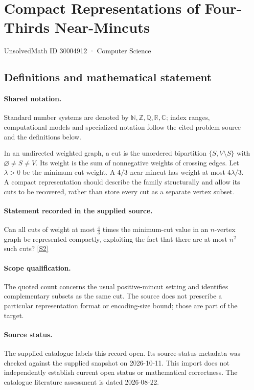 \documentclass[11pt]{article}
\newcommand{\sref}[2]{\hyperlink{source:#1:#2}{[S#2]}}
\begin{document}
\setcounter{section}{30004911}
\section{Compact Representations of Four-Thirds Near-Mincuts}\label{30004912}
{\small\sffamily UnsolvedMath ID 30004912 · Computer Science}
\subsection{Definitions and mathematical statement}

\paragraph{Shared notation.}Standard number systems are denoted by $\mathbb N,\mathbb Z,\mathbb Q,\mathbb R,\mathbb C$; index ranges, computational models and specialized notation follow the cited problem source and the definitions below.


In an undirected weighted graph, a cut is the unordered bipartition $\{S,V\setminus S\}$ with $\varnothing\ne S\ne V$. Its weight is the sum of nonnegative weights of crossing edges. Let $\lambda>0$ be the minimum cut weight. A $4/3$-near-mincut has weight at most $4\lambda/3$. A compact representation should describe the family structurally and allow its cuts to be recovered, rather than store every cut as a separate vertex subset.
\paragraph{Statement recorded in the supplied source.}
Can all cuts of weight at most $\tfrac43$ times the minimum-cut value in an $n$-vertex graph be represented compactly, exploiting the fact that there are at most $n^2$ such cuts? \sref{30004912}{2}
\paragraph{Scope qualification.}
The quoted count concerns the usual positive-mincut setting and identifies complementary subsets as the same cut. The source does not prescribe a particular representation format or encoding-size bound; those are part of the target.
\paragraph{Source status.}
The supplied catalogue labels this record open. Its source-status metadata was checked against the supplied snapshot on 2026-10-11. This import does not independently establish current open status or mathematical correctness. The catalogue literature assessment is dated 2026-08-22.
\end{document}
